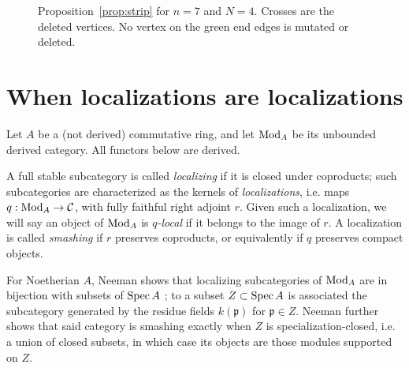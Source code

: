 \documentclass[12pt, letter]{amsart}
\theoremstyle{definition}
\numberwithin{equation}{section}
\begin{document}
\begin{figure}[htbp]
\caption{Proposition~\ref{prop:strip} for $n=7$ and $N=4$.
Crosses are the deleted vertices. No vertex on the green end edges is mutated or deleted.}
\label{fig:buffer}
\end{figure}





\clearpage


\section{When localizations are localizations}
\label{sec:localization}

Let $A$ be a (not derived) commutative ring, and let $\operatorname{Mod}_A$ be its unbounded
derived category.  All functors below are derived. 


A full stable subcategory is called {\em localizing} if it is closed under coproducts; such subcategories are characterized as the kernels of {\em localizations}, i.e. maps $q:\operatorname{Mod}_A\to\mathcal C$, with fully faithful right
adjoint $r$. 
Given such a localization, we will say an object of $\operatorname{Mod}_A$ is {\em $q$-local} if it belongs to the image of $r$.
A localization is called {\em  smashing} if $r$ preserves coproducts, or equivalently if $q$ preserves compact objects.


For Noetherian $A$, Neeman shows that localizing subcategories of $\operatorname{Mod}_A$ are in bijection with
subsets of $\operatorname{Spec} A$ \cite{Neeman}; to a subset $Z \subset \operatorname{Spec} A$ is associated the subcategory generated by the
residue fields $k(\mathfrak p)$ for $\mathfrak p\in Z$.
Neeman further shows that said category is smashing exactly when $Z$ is specialization-closed, i.e. a union of closed subsets, in which case its objects are those modules supported on $Z$.  
\end{document}
